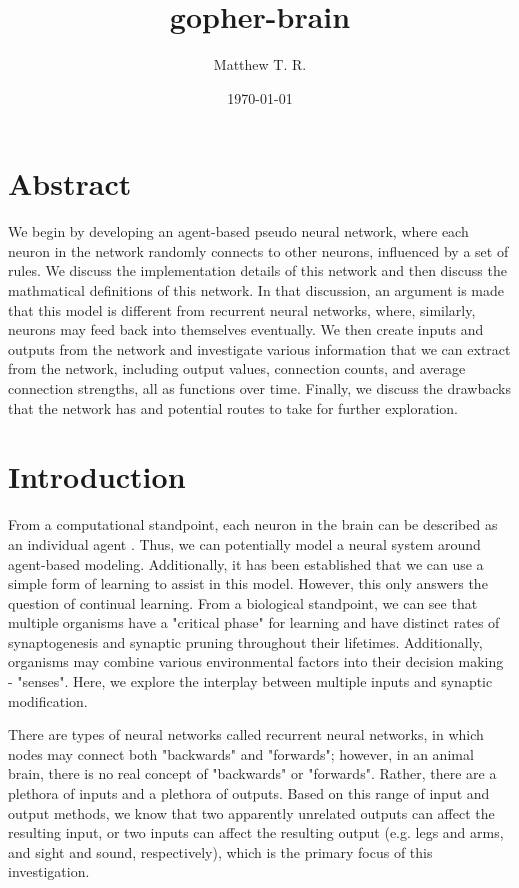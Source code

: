 \documentclass[12pt]{article}
\begin{document}
\title{gopher-brain}
\author{Matthew T. R.}
\date{\today{}}
\maketitle{}

\newpage

\tableofcontents{}

\newpage

\section{Abstract} \label{abstract}

We begin by developing an agent-based pseudo neural network, where each neuron in the network randomly connects to other neurons, influenced by a set of rules.  We discuss the implementation details of this network and then discuss the mathmatical definitions of this network.  In that discussion, an argument is made that this model is different from recurrent neural networks, where, similarly, neurons may feed back into themselves eventually.  We then create inputs and outputs from the network and investigate various information that we can extract from the network, including output values, connection counts, and average connection strengths, all as functions over time.  Finally, we discuss the drawbacks that the network has and potential routes to take for further exploration.

\section{Introduction} \label{intro}

From a computational standpoint, each neuron in the brain can be described as an individual agent \cite{agentbased}.  Thus, we can potentially model a neural system around agent-based modeling.  Additionally, it has been established that we can use a simple form of learning \cite{agentbased} to assist in this model.  However, this only answers the question of continual learning.  From a biological standpoint, we can see that multiple organisms have a "critical phase" for learning \cite{neurodev} and have distinct rates of synaptogenesis and synaptic pruning throughout their lifetimes.  Additionally, organisms may combine various environmental factors into their decision making - "senses".  Here, we explore the interplay between multiple inputs and synaptic modification.

There are types of neural networks called recurrent neural networks, in which nodes may connect both "backwards" and "forwards"; however, in an animal brain, there is no real concept of "backwards" or "forwards".  Rather, there are a plethora of inputs and a plethora of outputs.  Based on this range of input and output methods, we know that two apparently unrelated outputs can affect the resulting input, or two inputs can affect the resulting output (e.g. legs and arms, and sight and sound, respectively), which is the primary focus of this investigation.
\end{document}
